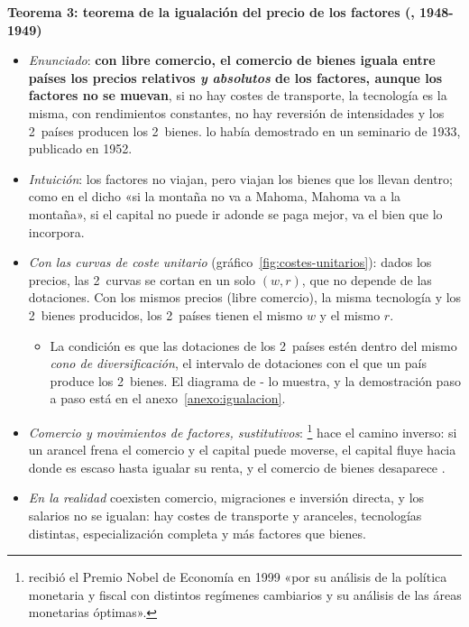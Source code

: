 \documentclass[11pt]{article}
\begin{document}
\textbf{Teorema 3: teorema de la igualación del precio de los factores (, 1948-1949)}

\begin{itemize}
\item \emph{Enunciado}: \textbf{con libre comercio, el comercio de bienes iguala entre países los precios relativos \emph{y absolutos} de los factores, aunque los factores no se muevan}, si no hay costes de transporte, la tecnología es la misma, con rendimientos constantes, no hay reversión de intensidades y los 2~países producen los 2~bienes\nocite{Samuelson1948International,Samuelson1949International}. \textcite{Lerner1952Factor} lo había demostrado en un seminario de 1933, publicado en 1952.

\item \emph{Intuición}: los factores no viajan, pero viajan los bienes que los llevan dentro; como en el dicho «si la montaña no va a Mahoma, Mahoma va a la montaña», si el capital no puede ir adonde se paga mejor, va el bien que lo incorpora.
\item \emph{Con las curvas de coste unitario} (gráfico~\ref{fig:costes-unitarios}): dados los precios, las 2~curvas se cortan en un solo $(w,r)$, que no depende de las dotaciones. Con los mismos precios (libre comercio), la misma tecnología y los 2~bienes producidos, los 2~países tienen el mismo $w$ y el mismo $r$.
  \begin{itemize}
  \item La condición es que las dotaciones de los 2~países estén dentro del mismo \emph{cono de diversificación}, el intervalo de dotaciones con el que un país produce los 2~bienes. El diagrama de - lo muestra, y la demostración paso a paso está en el anexo~\ref{anexo:igualacion}.
  \end{itemize}
\item \emph{Comercio y movimientos de factores, sustitutivos}: \textcite{Mundell1957}\footnote{ recibió el Premio Nobel de Economía en 1999 «por su análisis de la política monetaria y fiscal con distintos regímenes cambiarios y su análisis de las áreas monetarias óptimas»\nocite{Nobel1999Mundell}.} hace el camino inverso: si un arancel frena el comercio y el capital puede moverse, el capital fluye hacia donde es escaso hasta igualar su renta, y el comercio de bienes desaparece  .
\item \emph{En la realidad} coexisten comercio, migraciones e inversión directa, y los salarios no se igualan: hay costes de transporte y aranceles, tecnologías distintas, especialización completa y más factores que bienes.
\end{itemize}
\end{document}
